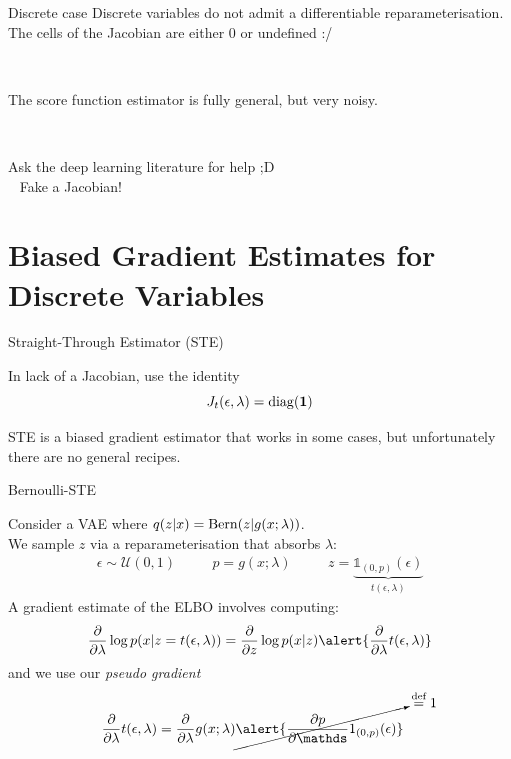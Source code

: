 \begin{frame}{Discrete case}
	Discrete variables do not admit a differentiable reparameterisation. The cells of the Jacobian are either $0$ or undefined :/
	
	~ \pause
	
	The score function estimator is fully general, but very noisy.
	
	~ \pause
	
	Ask the deep learning literature for help ;D \\ \pause
	~ \alert{Fake a Jacobian!}
\end{frame}

\section{Biased Gradient Estimates for Discrete Variables}


\begin{frame}{Straight-Through Estimator (STE)}

	In lack of a Jacobian, use the identity
	\begin{equation*}
		J_{t}(\epsilon, \lambda) = \operatorname{diag}(\mathbf 1)
	\end{equation*}
	
	
	STE is a biased gradient estimator that works in some cases, but unfortunately there are no general recipes.
	
\end{frame}

\begin{frame}{Bernoulli-STE}

	Consider a VAE where $q(z|x) = \operatorname{Bern}(z|g(x; \lambda))$. \pause \\
	We sample $z$ via a reparameterisation that absorbs $\lambda$:
	\begin{equation*}
		\begin{aligned}
			\epsilon \sim \mathcal U(0, 1) & \quad & p = g(x; \lambda) & \quad & z= \underbrace{\mathds 1_{(0, p)}(\epsilon)}_{t(\epsilon, \lambda)} 
		\end{aligned}
	\end{equation*}
	\pause
	A gradient estimate of the ELBO involves computing:
	\begin{equation*}
		\pdv{\lambda} \log p(x|z=t(\epsilon, \lambda)) = \pdv{z} \log p(x|z) \alert{\pdv{\lambda} t(\epsilon, \lambda)}
	\end{equation*}	
	\pause
	and we use our \emph{pseudo gradient}
	\vspace{-10pt}
	\begin{equation*}
		\begin{aligned}			
			\pdv{\lambda} t(\epsilon, \lambda) &=  \pdv{\lambda} g(x; \lambda)\cancelto{\overset{\text{def}}{=}1}{\alert{ \pdv{p} \mathds 1_{(0, p)}(\epsilon)}} 
		\end{aligned}
	\end{equation*}
	

\end{frame}


